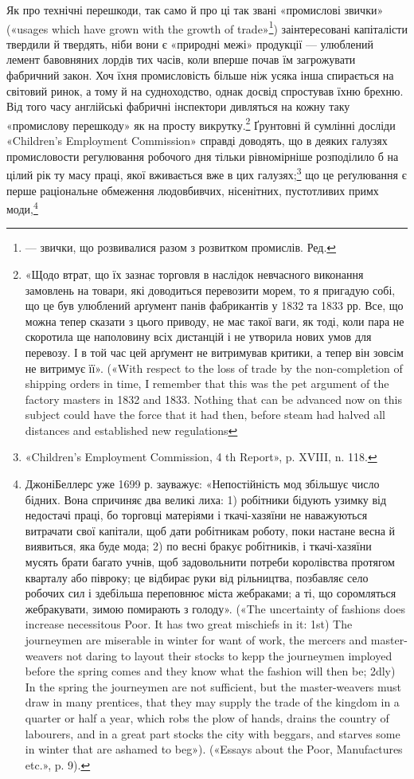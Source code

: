 Як про технічні перешкоди, так само й про ці так звані «промислові звички» («usages which have grown
with the growth of
trade»\footnote*{
— звички, що розвивалися разом з розвитком промислів. Ред.
}) заінтересовані капіталісти твердили й твердять, ніби
вони є «природні межі» продукції — улюблений лемент бавовняних лордів тих часів, коли вперше почав
їм загрожувати фабричний закон. Хоч їхня промисловість більше ніж усяка інша
спирається на світовий ринок, а тому й на судноходство, однак
досвід спростував їхню брехню. Від того часу англійські фабричні
інспектори дивляться на кожну таку «промислову перешкоду»
як на просту викрутку.\footnote{
«Щодо втрат, що їх зазнає торговля в наслідок невчасного виконання замовлень на товари, які
доводиться перевозити морем, то я пригадую
собі, що це був улюблений арґумент панів фабрикантів у 1832 та 1833 рр.
Все, що можна тепер сказати з цього приводу, не має такої ваги, як тоді,
коли пара не скоротила ще наполовину всіх дистанцій і не утворила нових
умов для перевозу. І в той час цей арґумент не витримував критики, а
тепер він зовсім не витримує її». («With respect to the loss of trade by
the non-completion of shipping orders in time, I remember that this was
the pet argument of the factory masters in 1832 and 1833. Nothing that
can be advanced now on this subject could have the force that it had then,
before steam had halved all distances and established new regulations
} Ґрунтовні й сумлінні досліди «Children’s
Employment Commission» справді доводять, що в деяких
галузях промисловости регулювання робочого дня тільки рівномірніше розподілило б на цілий рік ту
масу праці, якої вживається вже в цих галузях;\footnote{
«Children’s Employment Commission, 4 th Report», p. XVIII,
n. 118.
} що це реґулювання є перше раціональне
обмеження людовбивчих, нісенітних, пустотливих примх моди,\footnote{
ДжоніБеллерс уже 1699 р. зауважує: «Непостійність мод збільшує
число бідних. Вона спричиняє два великі лиха: 1) робітники бідують
узимку від недостачі праці, бо торговці матеріями і ткачі-хазяїни не
наважуються витрачати свої капітали, щоб дати робітникам роботу, поки
настане весна й виявиться, яка буде мода; 2) по весні бракує робітників,
і ткачі-хазяїни мусять брати багато учнів, щоб задовольнити потреби
королівства протягом кварталу або півроку; це відбирає руки від рільництва, позбавляє село робочих
сил і здебільша переповнює міста жебраками; а ті, що соромляться жебракувати, зимою помирають з
голоду».
(«The uncertainty of fashions does increase necessitous Poor. It has two
great mischiefs in it: 1st) The journeymen are miserable in winter for want
of work, the mercers and master-weavers not daring to layout their stocks
to kepp the journeymen imployed before the spring comes and they know
what the fashion will then be; 2dly) In the spring the journeymen are
not sufficient, but the master-weavers must draw in many prentices, that
they may supply the trade of the kingdom in a quarter or half a year, which
robs the plow of hands, drains the country of labourers, and in a great part
stocks the city with beggars, and starves some in winter that are ashamed
to beg»). («Essays about the Poor, Manufactures etc.», p. 9).
}
